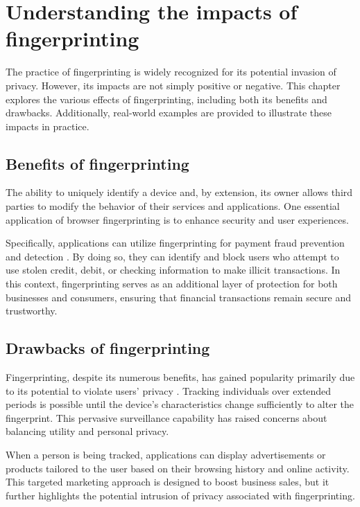 \section{Understanding the impacts of fingerprinting}
\label{UnderstandingFingerprinting}

The practice of fingerprinting is widely recognized for its potential invasion of privacy. However, its impacts are not simply positive or negative. This chapter explores the various effects of fingerprinting, including both its benefits and drawbacks. Additionally, real-world examples are provided to illustrate these impacts in practice.

\subsection{Benefits of fingerprinting}

The ability to uniquely identify a device and, by extension, its owner allows third parties to modify the behavior of their services and applications. One essential application of browser fingerprinting is to enhance security and user experiences.

Specifically, applications can utilize fingerprinting for payment fraud prevention and detection \cite{FingerprintJSUseCases}.  By doing so, they can identify and block users who attempt to use stolen credit, debit, or checking information to make illicit transactions. In this context, fingerprinting serves as an additional layer of protection for both businesses and consumers, ensuring that financial transactions remain secure and trustworthy.

\subsection{Drawbacks of fingerprinting}

Fingerprinting, despite its numerous benefits, has gained popularity primarily due to its potential to violate users' privacy \cite{WP224Fingerprinting}. Tracking individuals over extended periods is possible until the device's characteristics change sufficiently to alter the fingerprint. This pervasive surveillance capability has raised concerns about balancing utility and personal privacy.

When a person is being tracked, applications can display advertisements or products tailored to the user based on their browsing history and online activity. This targeted marketing approach is designed to boost business sales, but it further highlights the potential intrusion of privacy associated with fingerprinting.

